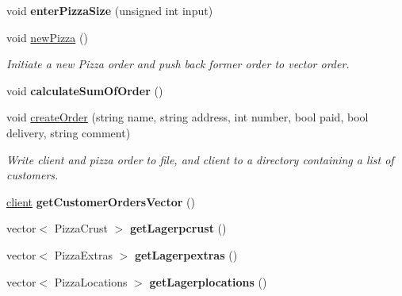 \begin{CompactItemize}
\item 
\hypertarget{class_sala_caeeb8aada209ebb8bde4749b2ececdc}{
void {\bf enter\-Pizza\-Size} (unsigned int input)}
\label{class_sala_caeeb8aada209ebb8bde4749b2ececdc}

\item 
\hypertarget{class_sala_eadce54d849ca6634b7fdd389bd8f192}{
void \hyperlink{class_sala_eadce54d849ca6634b7fdd389bd8f192}{new\-Pizza} ()}
\label{class_sala_eadce54d849ca6634b7fdd389bd8f192}

\begin{CompactList}\small\item\em Initiate a new Pizza order and push back former order to vector order. \item\end{CompactList}\item 
\hypertarget{class_sala_24b9bb5302a251b41fed3df1fb7ce8ad}{
void {\bf calculate\-Sum\-Of\-Order} ()}
\label{class_sala_24b9bb5302a251b41fed3df1fb7ce8ad}

\item 
void \hyperlink{class_sala_554463c0b82fb266c21e23e040bf1ac0}{create\-Order} (string name, string address, int number, bool paid, bool delivery, string comment)
\begin{CompactList}\small\item\em Write client and pizza order to file, and client to a directory containing a list of customers. \item\end{CompactList}\item 
\hypertarget{class_sala_3a31e5a83058a950f863932d3ecaef2e}{
\hyperlink{classclient}{client} {\bf get\-Customer\-Orders\-Vector} ()}
\label{class_sala_3a31e5a83058a950f863932d3ecaef2e}

\item 
\hypertarget{class_sala_85a631cad1f4009e87de7da3bc52174c}{
vector$<$ Pizza\-Crust $>$ {\bf get\-Lagerpcrust} ()}
\label{class_sala_85a631cad1f4009e87de7da3bc52174c}

\item 
\hypertarget{class_sala_49f231948b80188691882a8624a4612d}{
vector$<$ Pizza\-Extras $>$ {\bf get\-Lagerpextras} ()}
\label{class_sala_49f231948b80188691882a8624a4612d}

\item 
\hypertarget{class_sala_1e720a42845186f5057b36ab8b69711a}{
vector$<$ Pizza\-Locations $>$ {\bf get\-Lagerplocations} ()}
\label{class_sala_1e720a42845186f5057b36ab8b69711a}


\end{CompactItemize}

